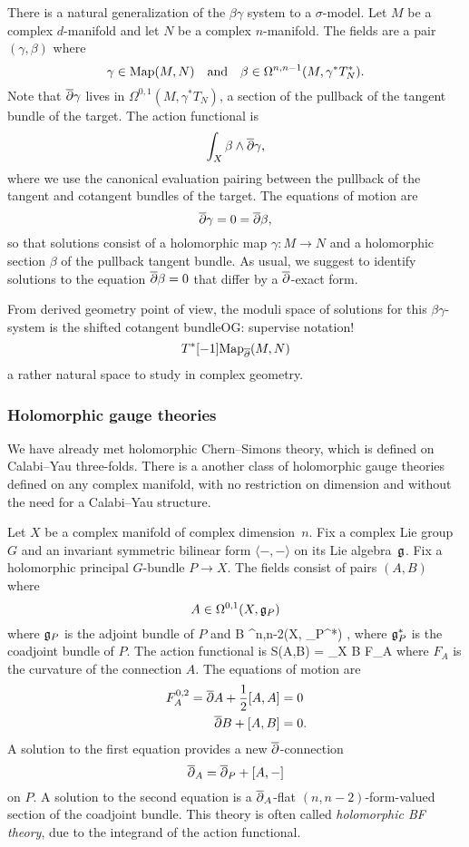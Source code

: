 \documentclass[11pt]{amsart}
\def\owen#1{{\textcolor{violet!50!black}{OG: {#1}}}}
\begin{document}
There is a natural generalization of the $\beta\gamma$ system to a $\sigma$-model.
Let $M$ be a complex $d$-manifold and let $N$ be a complex $n$-manifold.
The fields are a pair $(\gamma, \beta)$ where
\[
\gamma \in {\rm Map}(M,N) \quad\text{and}\quad \beta \in \Omega^{n,n-1}(M,\gamma^* T^*_N) .
\]
Note that ${\overline{\partial}} \gamma$ lives in $\Omega^{0,1}(M, \gamma^* T_N)$, 
a section of the pullback of the tangent bundle of the target.
The action functional is 
\[
\int_X \beta \wedge {\overline{\partial}} \gamma,
\]
where we use the canonical evaluation pairing between the pullback of the tangent and cotangent bundles of the target.
The equations of motion are
\[
{\overline{\partial}} \gamma = 0 = {\overline{\partial}} \beta,
\]
so that solutions consist of a holomorphic map $\gamma: M \to N$ and a holomorphic section $\beta$ of the pullback tangent bundle.
As usual, we suggest to identify solutions to the equation ${\overline{\partial}} \beta = 0$ that differ by a ${\overline{\partial}}$-exact form.

From derived geometry point of view, the moduli space of solutions for this $\beta\gamma$-system is the shifted cotangent bundle\owen{supervise notation!}
\[
T^*[-1] {\rm Map}_{\overline{\partial}}(M,N) 
\]
a rather natural space to study in complex geometry.

\subsubsection{Holomorphic gauge theories}
\label{sec: hol BF dfn}

We have already met holomorphic Chern--Simons theory, which is defined on Calabi--Yau three-folds.
There is a another class of holomorphic gauge theories 
defined on any complex manifold, with no restriction on dimension 
and without the need for a Calabi--Yau structure. 

Let $X$ be a complex manifold of complex dimension~$n$.
Fix a complex Lie group $G$ and an invariant symmetric bilinear form $\langle-,-\rangle$ on its Lie algebra~$\mathfrak g$.
Fix a holomorphic principal $G$-bundle $P \to X$.
The fields consist of pairs $(A,B)$ where 
\[
A \in \Omega^{0,1}(X, \mathfrak g_P)
\] 
where $\mathfrak g_P$ is the adjoint bundle of $P$ and
\beqn
B \in \Omega^{n,n-2}(X, \fg_P^*) ,
\eeqn
where $\mathfrak g_P^*$ is the coadjoint bundle of $P$. 
The action functional is 
\beqn
S(A,B) = \int_X \langle B \wedge F_A \rangle
\eeqn
where $F_A$ is the curvature of the connection $A$.
The equations of motion are
\begin{align*}
F_A^{0,2} = {\overline{\partial}} A + \frac12 [A,A] & = 0 \\
 {\overline{\partial}} B + [A,B] & = 0.
\end{align*}
A solution to the first equation provides a new ${\overline{\partial}}$-connection 
\[
{\overline{\partial}}_A = {\overline{\partial}}_P + [A,-] 
\]
on $P$.
A solution to the second equation is a ${\overline{\partial}}_A$-flat $(n,n-2)$-form-valued section of the coadjoint bundle.
This theory is often called {\em holomorphic BF theory}, due to the integrand of the action functional.
\end{document}
